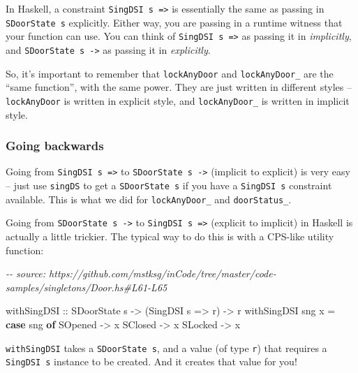 \documentclass[]{article}
\newenvironment{Shaded}{}{}
\newcommand{\CommentTok}[1]{\textcolor[rgb]{0.38,0.63,0.69}{\textit{#1}}}
\newcommand{\DataTypeTok}[1]{\textcolor[rgb]{0.56,0.13,0.00}{#1}}
\newcommand{\KeywordTok}[1]{\textcolor[rgb]{0.00,0.44,0.13}{\textbf{#1}}}
\newcommand{\NormalTok}[1]{#1}
\newcommand{\OtherTok}[1]{\textcolor[rgb]{0.00,0.44,0.13}{#1}}
\begin{document}
In Haskell, a constraint \texttt{SingDSI\ s\ =\textgreater{}} is essentially the
same as passing in \texttt{SDoorState\ s} explicitly. Either way, you are
passing in a runtime witness that your function can use. You can think of
\texttt{SingDSI\ s\ =\textgreater{}} as passing it in \emph{implicitly}, and
\texttt{SDoorState\ s\ -\textgreater{}} as passing it in \emph{explicitly}.

So, it's important to remember that \texttt{lockAnyDoor} and
\texttt{lockAnyDoor\_} are the ``same function'', with the same power. They are
just written in different styles -- \texttt{lockAnyDoor} is written in explicit
style, and \texttt{lockAnyDoor\_} is written in implicit style.

\subsubsection{Going backwards}\label{going-backwards}

Going from \texttt{SingDSI\ s\ =\textgreater{}} to
\texttt{SDoorState\ s\ -\textgreater{}} (implicit to explicit) is very easy --
just use \texttt{singDS} to get a \texttt{SDoorState\ s} if you have a
\texttt{SingDSI\ s} constraint available. This is what we did for
\texttt{lockAnyDoor\_} and \texttt{doorStatus\_}.

Going from \texttt{SDoorState\ s\ -\textgreater{}} to
\texttt{SingDSI\ s\ =\textgreater{}} (explicit to implicit) in Haskell is
actually a little trickier. The typical way to do this is with a CPS-like
utility function:

\begin{Shaded}
\begin{Highlighting}[]
\CommentTok{{-}{-} source: https://github.com/mstksg/inCode/tree/master/code{-}samples/singletons/Door.hs\#L61{-}L65}

\OtherTok{withSingDSI ::} \DataTypeTok{SDoorState}\NormalTok{ s }\OtherTok{{-}\textgreater{}}\NormalTok{ (}\DataTypeTok{SingDSI}\NormalTok{ s }\OtherTok{=\textgreater{}}\NormalTok{ r) }\OtherTok{{-}\textgreater{}}\NormalTok{ r}
\NormalTok{withSingDSI sng x }\OtherTok{=} \KeywordTok{case}\NormalTok{ sng }\KeywordTok{of}
    \DataTypeTok{SOpened} \OtherTok{{-}\textgreater{}}\NormalTok{ x}
    \DataTypeTok{SClosed} \OtherTok{{-}\textgreater{}}\NormalTok{ x}
    \DataTypeTok{SLocked} \OtherTok{{-}\textgreater{}}\NormalTok{ x}
\end{Highlighting}
\end{Shaded}

\texttt{withSingDSI} takes a \texttt{SDoorState\ s}, and a value (of type
\texttt{r}) that requires a \texttt{SingDSI\ s} instance to be created. And it
creates that value for you!
\end{document}
